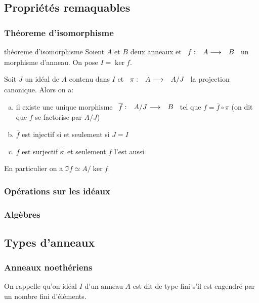 \subsection{Propriétés remaquables}

\subsubsection{Théoreme d'isomorphisme}

\begin{theorem}{théoreme d'isomorphisme}{}
    Soient $A$ et $B$ deux anneaux et $\begin{array}[t]{ccc}f : & A \longrightarrow & B\end{array}$ un morphisme d'anneau.
    On pose $I = \ker{f}$.

    Soit $J$ un idéal de $A$ contenu dans $I$ et $\begin{array}[t]{ccc}\pi : & A \longrightarrow & A/J\end{array}$ la projection canonique. Alors on a:
    \begin{enumerate}[(a)]
        \item il existe une unique morphisme $\begin{array}[t]{ccc}\overline{f} : & A/J \longrightarrow & B\end{array}$ tel que $f = \overline{f} \circ \pi$
                (on dit que $f$ se factorise par $A/J$)
        \item $\overline{f}$ est injectif si et seulement si $J = I$
        \item $\overline{f}$ est surjectif si et seulement $f$ l'est aussi
    \end{enumerate}

    En particulier on a $\Im{f} \simeq A/\ker{f}$.
\end{theorem}

\subsubsection{Opérations sur les idéaux}

\subsubsection{Algèbres}




\subsection{Types d'anneaux}

\subsubsection{Anneaux noethériens}

On rappelle qu'on idéal $I$ d'un anneau $A$ est dit de type fini s'il est engendré par un nombre fini d'éléments.


